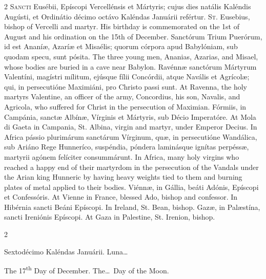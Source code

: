\begin{paracol}{2}
\lettrine[lines=2]{S}{ancti} Eusébii, Epíscopi Vercellénsis et Mártyris; cujus dies natális 
 Kaléndis Augústi, et Ordinátio décimo octávo Kaléndas Januárii refértur.
\switchcolumn
{}
\lettrine[lines=2]{S}{t.} Eusebius, bishop of Vercelli and martyr. His birthday is 
 commemorated on the 1st of August and his ordination on the 15th of 
 December.
\switchcolumn*
{}
Sanctórum Trium Puerórum, id est Ananíæ, Azaríæ 
 et Misaélis; quorum córpora apud Babylóniam, sub quodam specu, sunt pósita.
\switchcolumn
{}
The three young men, Ananias, Azarias, and Misael, whose bodies are buried 
 in a cave near Babylon.
\switchcolumn*
{}
Ravénnæ sanctórum Mártyrum Valentíni, magístri mílitum, ejúsque fílii
  Concórdii, atque Navális et Agrícolæ; qui, in persecutióne Maximiáni, pro
  Christo passi sunt.
\switchcolumn
{}
At 
 Ravenna, the holy martyrs Valentine, an officer of the army, Concordius, his 
 son, Navalis, and Agricola, who suffered for Christ in the persecution of 
 Maximian.
\switchcolumn*
{}
Fórmiis, in Campánia, sanctæ Albínæ, Vírginis 
 et Mártyris, sub Décio Imperatóre.
\switchcolumn
{}
At 
 Mola di Gaeta in Campania, St. Albina, virgin and martyr, under Emperor 
 Decius.
\switchcolumn*
{}
In 
 Africa pássio plurimárum sanctárum Vírginum, quæ, 
 in persecutióne Wandálica, sub Ariáno Rege Hunneríco, suspéndia, póndera 
 laminásque ignítas perpéssæ, martyrii agónem felíciter consummárunt.
\switchcolumn
{}
In 
 Africa, many holy virgins who reached a happy end of their martyrdom in the 
 persecution of the Vandals under the Arian king Hunneric by having heavy 
 weights tied to them and burning plates of metal applied to their bodies.
\switchcolumn*
{}
Viénnæ, in Gállia, beáti Adónis, Epíscopi et 
 Confessóris.
\switchcolumn
{}
At 
 Vienne in France, blessed Ado, bishop and confessor.
\switchcolumn*
{}
In 
 Hibérnia sancti Beáni Epíscopi.
\switchcolumn
{}
In 
 Ireland, St. Bean, bishop.
\switchcolumn*
{}
Gazæ, in Palæstína, sancti Ireniónis Epíscopi.
\switchcolumn
{}
At Gaza in Palestine, St. Irenion, bishop.
\switchcolumn*
{}
\end{paracol}


\begin{paracol}{2}
\begin{center}{\color{gregoriocolor} Sextodécimo Kaléndas Januárii. 
 Luna\dots\ }\end{center}
\switchcolumn
{}
\begin{center}{\color{gregoriocolor} The 
 17\textsuperscript{th} Day of 
 December. The\dots\ Day of the Moon.}\end{center}
\end{paracol}

